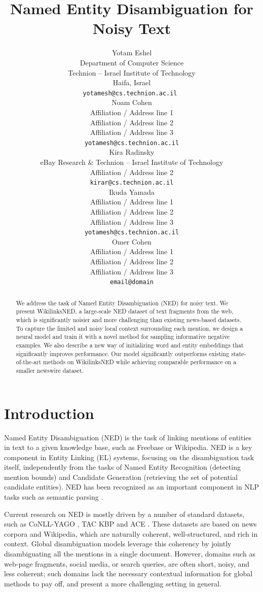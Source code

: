 \documentclass[11pt,a4paper]{article}
\title{Named Entity Disambiguation for Noisy Text}
\author{Yotam Eshel \\
	Department of Computer Science \\
	Technion – Israel Institute of Technology \\
	Haifa, Israel \\
	{\tt yotamesh@cs.technion.ac.il  } \\
	\And
	Noam Cohen \\
	Affiliation / Address line 1 \\ 
	Affiliation / Address line 2 \\
	Affiliation / Address line 3 \\ 
	{\tt yotamesh@cs.technion.ac.il} \\
	\And
	Kira Radinsky \\
	eBay Research \& Technion  – Israel Institute of Technology \\ 
	Affiliation / Address line 2 \\
	{\tt kirar@cs.technion.ac.il} \\
	\And
	Ikuda Yamada \\
	Affiliation / Address line 1 \\ 
	Affiliation / Address line 2 \\
	Affiliation / Address line 3 \\
	{\tt yotamesh@cs.technion.ac.il} \\
	\And
	Omer Cohen \\
	Affiliation / Address line 1 \\ 
	Affiliation / Address line 2 \\
	Affiliation / Address line 3 \\
	{\tt email@domain} \\}
\date{}
\begin{document}
	\maketitle
	\begin{abstract}
		We address the task of Named Entity Disambiguation (NED) for noisy text. 
		We present WikilinksNED, a large-scale NED dataset of text fragments from the web, which is significantly noisier and more challenging than existing news-based datasets.
		To capture the limited and noisy local context surrounding each mention, we design a neural model and train it with a novel method for sampling informative negative examples. We also describe a new way of initializing word and entity embeddings that significantly improves performance.
		Our model significantly outperforms existing state-of-the-art methods on WikilinksNED while achieving comparable performance on a smaller newswire dataset.
	\end{abstract}
	
	
	
	\section{Introduction}
			
	Named Entity Disambiguation (NED) is the task of linking mentions of entities in text to a given knowledge base, such as Freebase or Wikipedia. 
	NED is a key component in Entity Linking (EL) systems, focusing on the disambiguation task itself, independently from the tasks of Named Entity Recognition (detecting mention bounds) and Candidate Generation (retrieving the set of potential candidate entities). NED has been recognized as an important component in NLP tasks such as semantic parsing \cite{berant2013semantic}.
		
	Current research on NED is mostly driven by a number of standard datasets, such as CoNLL-YAGO \cite{hoffart2011robust}, TAC KBP \cite{ji2010overview} and ACE \cite{bentivogli2010extending}. These datasets are based on news corpora and Wikipedia, which are naturally coherent, well-structured, and rich in context. Global disambiguation models \cite{guo2014entity,pershina2015personalized,Globerson2016} leverage this coherency by jointly disambiguating all the mentions in a single document. However, domains such as web-page fragments, social media, or search queries, are often short, noisy, and less coherent; such domains lack the necessary contextual information for global methods to pay off, and present a more challenging setting in general.
\end{document}
